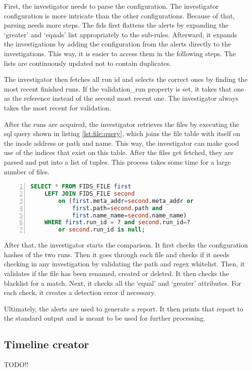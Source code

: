 First, the investigator needs to parse the configuration. The investigator configuration is more intricate than the other configurations. Because of that, parsing needs more steps. The \gls{fids} first flattens the alerts by expanding the `greater' and `equals' list appropriately to the sub-rules. Afterward, it expands the investigations by adding the configuration from the alerts directly to the investigations. This way, it is easier to access them in the following steps. The lists are continuously updated not to contain duplicates.

The investigator then fetches all run \gls{id} and selects the correct ones by finding the most recent finished runs. If the validation_run property is set, it takes that one as the reference instead of the second most recent one. The investigator always takes the most recent for validation.

After the runs are acquired, the investigator retrieves the files by executing the \gls{sql} query shown in listing \ref{lst:file:query}, which joins the file table with itself on the inode address or path and name. This way, the investigator can make good use of the indices that exist on this table. After the files get fetched, they are parsed and put into a list of tuples. This process takes some time for a large number of files. 

\begin{lstlisting}[language=sql, numbers=left, caption=SQL Querry for files, label=lst:file:query]
SELECT * FROM FIDS_FILE first 
    LEFT JOIN FIDS_FILE second 
        on (first.meta_addr=second.meta_addr or 
            first.path=second.path and 
            first.name_name=second.name_name)
    WHERE first.run_id = ? and second.run_id=? 
        or second.run_id is null;
\end{lstlisting}

After that, the investigator starts the comparison. It first checks the configuration hashes of the two runs. Then it goes through each file and checks if it needs checking in any investigation by validating the path and \gls{regex} whitelist. Then, it validates if the file has been renamed, created or deleted. It then checks the blacklist for a match.  Next, it checks all the `equal' and `greater' attributes. For each check, it creates a detection error if necessary. 

Ultimately, the alerts are used to generate a report. It then prints that report to the standard output and is meant to be used for further processing. 

\subsection{Timeline creator}
\label{sec:Timeliner}

TODO!!